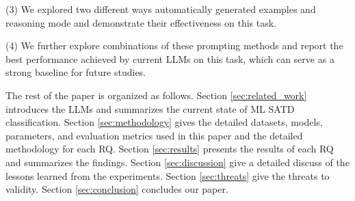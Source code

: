 \documentclass[acmsmall,screen,review,anonymous]{acmart}
\begin{document}
(3) We explored two different ways automatically generated examples and reasoning mode and demonstrate their effectiveness on this task.

(4) We further explore combinations of these prompting methods and report the best performance achieved by current LLMs on this task, which can serve as a strong baseline for future studies.




The rest of the paper is organized as follows. Section \ref{sec:related_work} introduces the LLMs and summarizes the current state of ML SATD classification. Section \ref{sec:methodology} gives the detailed datasets, models, parameters, and evaluation metrics used in this paper and the detailed methodology for each RQ. Section \ref{sec:results} presents the results of each RQ and summarizes the findings. Section \ref{sec:discussion} give a detailed discuss of the lessons learned from the experiments. Section \ref{sec:threats} give the threats to validity. Section \ref{sec:conclusion} concludes our paper.








\end{document}
